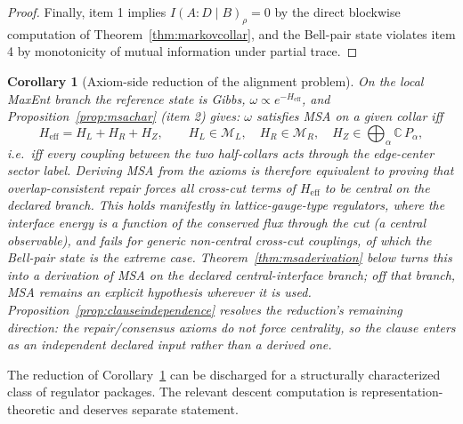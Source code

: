 \documentclass[11pt]{article}
\newtheorem{corollary}[theorem]{Corollary}
\begin{document}
\begin{proof}
Finally, item 1 implies \(I(A:D\mid B)_\rho=0\) by the direct blockwise computation of Theorem~\ref{thm:markovcollar}, and the Bell-pair state violates item 4 by monotonicity of mutual information under partial trace.
\end{proof}

\begin{corollary}[Axiom-side reduction of the alignment problem]\label{cor:msareduction}
On the local MaxEnt branch the reference state is Gibbs, \(\omega\propto e^{-H_{\mathrm{eff}}}\), and Proposition~\ref{prop:msachar} (item 2) gives: \(\omega\) satisfies MSA on a given collar iff
\[
H_{\mathrm{eff}}=H_L+H_R+H_Z,
\qquad
H_L\in\mathcal M_L,\quad H_R\in\mathcal M_R,\quad H_Z\in\bigoplus_\alpha\mathbb C\,P_\alpha,
\]
i.e.\ iff every coupling between the two half-collars acts through the edge-center sector label. Deriving MSA from the axioms is therefore \emph{equivalent} to proving that overlap-consistent repair forces all cross-cut terms of \(H_{\mathrm{eff}}\) to be central on the declared branch. This holds manifestly in lattice-gauge-type regulators, where the interface energy is a function of the conserved flux through the cut (a central observable), and fails for generic non-central cross-cut couplings, of which the Bell-pair state is the extreme case. Theorem~\ref{thm:msaderivation} below turns this into a derivation of MSA on the declared central-interface branch; off that branch, MSA remains an explicit hypothesis wherever it is used. Proposition~\ref{prop:clauseindependence} resolves the reduction's remaining direction: the repair/consensus axioms do not force centrality, so the clause enters as an independent declared input rather than a derived one.
\end{corollary}

The reduction of Corollary~\ref{cor:msareduction} can be discharged for a structurally characterized class of regulator packages. The relevant descent computation is representation-theoretic and deserves separate statement.
\end{document}
